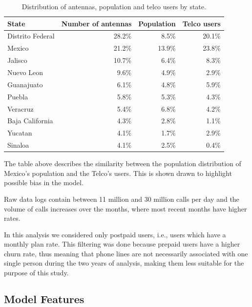 \begin{table}[ht]
	\caption{Distribution of antennas, population and telco users by state.}
	\label{tab:distribution_by_state}
	\centering
	\begin{tabular}{l r r r}
		\toprule
		State				& Number of antennas & Population 	& Telco users \\
		\midrule
		Distrito Federal    & 28.2\% 	& 8.5\%		& 20.1\%  \\
		Mexico              & 21.2\%		&  13.9\% 	& 23.8\%  \\
		Jalisco             & 10.7\% 	& 6.4\%		& 8.3\%   \\
		Nuevo Leon          & 9.6\%	& 4.9\%		& 2.9\% \\
		Guanajuato          & 6.1\%	& 4.8\%		& 5.9\% \\
		Puebla              & 5.8\%	& 5.3\%		& 4.3\% \\
		Veracruz            & 5.4\% 	& 6.8\%		& 4.2\% \\
		Baja California     & 4.3\%	& 2.8\%		& 1.1\% \\
		Yucatan             & 4.1\%	& 1.7\%		& 2.9\% \\
		Sinaloa             & 4.1\%	& 2.5\%		& 0.4\% \\
		\bottomrule
	\end{tabular}
\end{table}

The table above describes the similarity between the population distribution of Mexico's population and the Telco's users. This is shown drawn to highlight  possible bias in the model.

Raw data logs contain between 11 million and 30 million calls per day and the volume of calls increases over the months, where most recent months have higher rates.

In this analysis we considered only postpaid users, i.e., users which have a monthly  plan rate. This filtering was done because prepaid users have a higher churn rate, thus meaning that phone lines are not necessarily associated with one single person during the two years of analysis, making them less suitable for the purpose of this study.




\subsection{Model Features}


